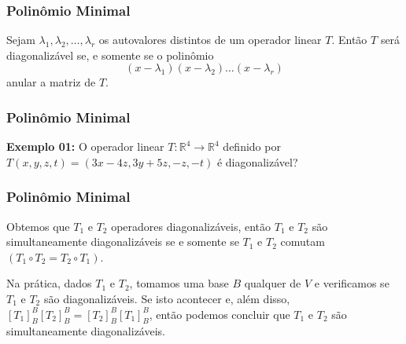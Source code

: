 \documentclass[hyperref={pdfpagelabels=false}]{beamer}
\begin{document}
\begin{frame}
\frametitle{Polinômio Minimal}

\begin{theorem}
	Sejam $\lambda_1,\lambda_2,\dots, \lambda_r$ os autovalores distintos de um operador linear $T$. Então $T$ será diagonalizável se, e somente se o polinômio
	$$(x - \lambda_1)(x-\lambda_2)\dots(x - \lambda_r)$$
	anular a matriz de $T$.
\end{theorem}

\end{frame}


\begin{frame}
\frametitle{Polinômio Minimal}

{\bf Exemplo 01: } O operador linear $T:\mathbb{R}^4 \rightarrow \mathbb{R}^4$ definido por $T(x,y,z,t) = (3x-4z,3y+5z,-z,-t)$ é diagonalizável?

\end{frame}


\begin{frame}
\frametitle{Polinômio Minimal}

Obtemos que $T_1$ e $T_2$ operadores diagonalizáveis, então $T_1$ e $T_2$ são simultaneamente diagonalizáveis se e somente se $T_1$ e $T_2$ comutam $(T_1 \circ T_2 = T_2 \circ T_1)$.

Na prática, dados $T_1$ e $T_2$, tomamos uma base $B$ qualquer de $V$ e verificamos se $T_1$ e $T_2$ são diagonalizáveis. Se isto acontecer e, além disso, $[T_1]_{B}^{B}[T_2]_{B}^{B} = [T_2]_{B}^{B}[T_1]_{B}^{B}$, então podemos concluir que $T_1$ e $T_2$ são simultaneamente diagonalizáveis.

\end{frame}
\end{document}
